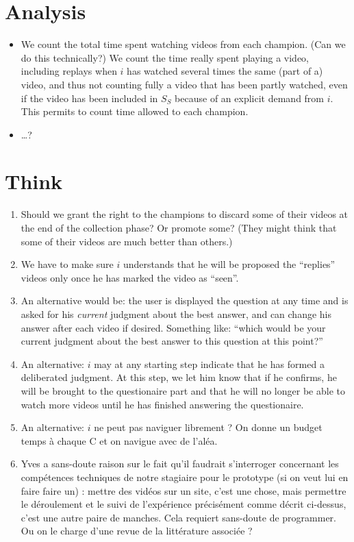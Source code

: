 \documentclass[version=3.21, pagesize, twoside=off, bibliography=totoc, DIV=calc, fontsize=12pt, a4paper]{scrartcl}
\begin{document}
\section{Analysis}
\begin{itemize}
	\item We count the total time spent watching videos from each champion. (Can we do this technically?) We count the time really spent playing a video, including replays when $i$ has watched several times the same (part of a) video, and thus not counting fully a video that has been partly watched, even if the video has been included in $S_S$ because of an explicit demand from $i$. This permits to count time allowed to each champion.
	\item …?
\end{itemize}

\section{Think}
\begin{enumerate}
	\item Should we grant the right to the champions to discard some of their videos at the end of the collection phase? Or promote some? (They might think that some of their videos are much better than others.)
	\item We have to make sure $i$ understands that he will be proposed the “replies” videos only once he has marked the video as “seen”.
	\item An alternative would be: the user is displayed the question at any time and is asked for his \emph{current} judgment about the best answer, and can change his answer after each video if desired. Something like: “which would be your current judgment about the best answer to this question at this point?”
	\item An alternative: $i$ may at any starting step indicate that he has formed a deliberated judgment. At this step, we let him know that if he confirms, he will be brought to the questionaire part and that he will no longer be able to watch more videos until he has finished answering the questionaire.
	\item An alternative: $i$ ne peut pas naviguer librement ? On donne un budget temps à chaque C et on navigue avec de l’aléa.
	\item Yves a sans-doute raison sur le fait qu’il faudrait s’interroger concernant les compétences techniques de notre stagiaire pour le prototype (si on veut lui en faire faire un) : mettre des vidéos sur un site, c’est une chose, mais permettre le déroulement et le suivi de l’expérience précisément comme décrit ci-dessus, c’est une autre paire de manches. Cela requiert sans-doute de programmer. Ou on le charge d’une revue de la littérature associée ?
\end{enumerate}
\end{document}
